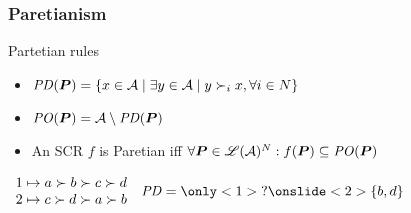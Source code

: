 \documentclass[french, english]{beamer}
\begin{document}
\begin{frame}[fragile]
	\frametitle{Paretianism}
	\begin{block}{Partetian rules}
		\begin{itemize}
			\item $\PD(\prof) = \set{x \in \allalts \suchthat \exists y \in \allalts \suchthat y \prefi x, \forall i \in N}$
			\item $\mathit{PO}(\boldsymbol{P}) = \mathcal{A} \setminus \mathit{PD}(\boldsymbol{P})$
			\item An \ac{SCR} $f$ is Paretian iff $\forall \boldsymbol{P} \in \mathscr{L}(\mathcal{A})^N: f(\boldsymbol{P}) \subseteq \mathit{PO}(\boldsymbol{P})$
		\end{itemize}
	\end{block}
	\begin{example}
		$\begin{array}{r@{\hspace{1mm} \mapsto \hspace{1mm}}l}
			1 & a \pref b \pref c \pref d\\%
			2 & c \pref d \pref a \pref b\\%
		\end{array}$%
		\hspace{2cm} $\PD = \only<1>{\text{?}}\onslide<2>{\set{b, d}}$
	\end{example}
\end{frame}
\end{document}
